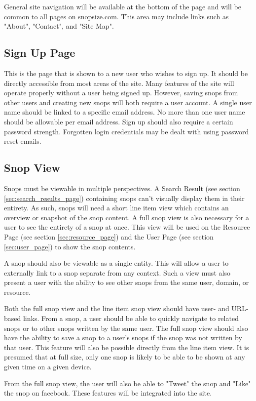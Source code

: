 \documentclass[11pt]{article}
\begin{document}
General site navigation will be available at the bottom of the page and will be common to all pages on snopsize.com. This area may include links such as "About", "Contact", and "Site Map".
\subsection{Sign Up Page}
This is the page that is shown to a new user who wishes to sign up. It should be directly accessible from most areas of the site. Many features of the site will operate properly without a user being signed up. However, saving snops from other users and creating new snops will both require a user account. A single user name should be linked to a specific email address. No more than one user name should be allowable per email address. Sign up should also require a certain password strength. Forgotten login credentials may be dealt with using password reset emails.
\subsection{Snop View}
Snops must be viewable in multiple perspectives. A Search Result (see section \ref{sec:search_results_page}) containing snops can't visually display them in their entirety. As such, snops will need a short line item view which contains an overview or snapshot of the snop content. A full snop view is also necessary for a user to see the entirety of a snop at once. This view will be used on the Resource Page (see section \ref{sec:resource_page}) and the User Page (see section \ref{sec:user_page}) to show the snop contents. 

A snop should also be viewable as a single entity. This will allow a user to externally link to a snop separate from any context. Such a view must also present a user with the ability to see other snops from the same user, domain, or resource.

Both the full snop view and the line item snop view should have user- and URL-based links. From a snop, a user should be able to quickly navigate to related snops or to other snops written by the same user. The full snop view should also have the ability to save a snop to a user's snops if the snop was not written by that user. This feature will also be possible directly from the line item view. It is presumed that at full size, only one snop is likely to be able to be shown at any given time on a given device.

From the full snop view, the user will also be able to "Tweet" the snop and "Like" the snop on facebook. These features will be integrated into the site. 
\end{document}
